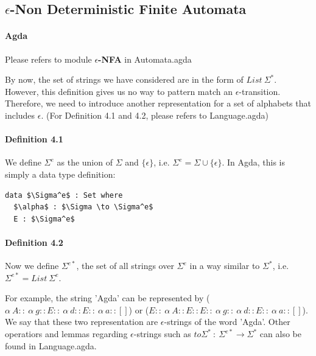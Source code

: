 \documentclass[twoside,openright,final]{bhamthesis}
\begin{document}
\subsection{\(\epsilon\)-Non Deterministic Finite Automata}
\paragraph{Agda} Please refers to module \textbf{\(\epsilon\)-NFA} in
Automata.agda \\

\par By now, the set of strings we have considered are in the form of
\(List\ \Sigma^*\). However, this definition gives us no way to pattern match
an \(\epsilon\)-transition. Therefore, we need to introduce another
representation for a set of alphabets that includes \(\epsilon\). (For Definition 4.1 and
4.2, please refers to Language.agda)

\paragraph{Definition 4.1} We define \(\Sigma^e\) as the union of
\(\Sigma\) and \(\{\epsilon\}\), i.e. \(\Sigma^e = \Sigma \cup
\{\epsilon\}\). In Agda, this is simply a data type definition:
\begin{lstlisting}[mathescape=true,xleftmargin=.4\textwidth,aboveskip=0pt,belowskip=0pt]
data $\Sigma^e$ : Set where
  $\alpha$ : $\Sigma \to \Sigma^e$
  E : $\Sigma^e$
\end{lstlisting}

\paragraph{Definition 4.2} Now we define \(\Sigma^{e*}\), the set of all strings over
\(\Sigma^e\) in a way similar to \(\Sigma^*\), i.e. \(\Sigma^{e*} =
List\ \Sigma^e\). \\

\par For example, the string 'Agda' can be
represented by (\(\alpha\ A ::\ \alpha\ g :: E ::\ \alpha\ d :: E ::\ \alpha\
a :: []\)) or (\(E ::\ \alpha\ A :: E :: E ::\ \alpha\ g ::\ \alpha\ d :: E ::\ \alpha\
a :: []\)). We say that these two representation are
\(\epsilon\)-strings of the word 'Agda'. Other operatiors and lemmas
regarding \(\epsilon\)-strings such
as \(to\Sigma^*\ :\ \Sigma^{e*} \to \Sigma^*\) can also be found in
Language.agda. 
\end{document}

